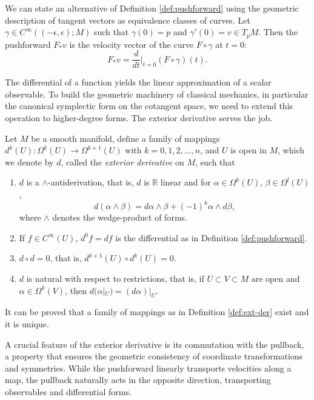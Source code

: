 \begin{remark}
	We can state an alternative of Definition \ref{def:pushforward} using the geometric description of tangent vectors as equivalence classes of curves. Let $\gamma \in C^\infty( (-\epsilon, \epsilon); M)$ such that $\gamma(0) = p$ and $\gamma'(0) = v \in T_pM$. Then the pushforward $F_*v$ is the velocity vector of the curve $F \circ \gamma$ at $t = 0$:
	\[
	F_*v = \frac{d}{dt}\Big|_{t=0} (F \circ \gamma)(t).
	\]
\end{remark}

The differential of a function yields the linear approximation of a scalar observable. To build the geometric machinery of classical mechanics, in particular the canonical symplectic form on the cotangent space, we need to extend this operation to higher-degree forms. The exterior derivative serves the job.

\begin{definition}\label{def:ext-der}
	Let $M$ be a smooth manifold, define a family of mappings $d^k(U) : \Omega^k(U) \to \Omega^{k+1}(U)$ with $k = 0,1,2,\dots,n$, and $U$ is open in $M$, which we denote by $d$, called the \emph{exterior derivative} on $M$, such that
	\begin{enumerate}
		\item[(i)] $d$ is a $\wedge$-antiderivation, that is, $d$ is $\mathbb{R}$ linear and for $\alpha \in \Omega^k(U)$, $\beta \in \Omega^l(U)$,
		\[
		d(\alpha\wedge\beta) = d\alpha\wedge\beta + (-1)^k\alpha\wedge d\beta,
		\]
		where $\wedge$ denotes the wedge-product of forms.
		\item[(ii)] If $f \in C^\infty(U)$, $d^0f = df$ is the differential as in Definition \ref{def:pushforward}.
		\item[(iii)] $d\circ d = 0$, that is, $d^{k+1}(U)\circ d^k(U) = 0$.
		\item[(iv)] $d$ is natural with respect to restrictions, that is, if $U \subset V \subset M$ are open and $\alpha \in \Omega^k(V)$, then $d(\alpha|_U) = (d\alpha)|_U$.
	\end{enumerate}
\end{definition}

\begin{remark}
	It can be proved that a family of mappings as in Definition \ref{def:ext-der} exist and it is unique.
\end{remark}

A crucial feature of the exterior derivative is its commutation with the pullback, a property that ensures the geometric consistency of coordinate transformations and symmetries. While the pushforward linearly transports velocities along a map, the pullback naturally acts in the opposite direction, transporting observables and differential forms.

